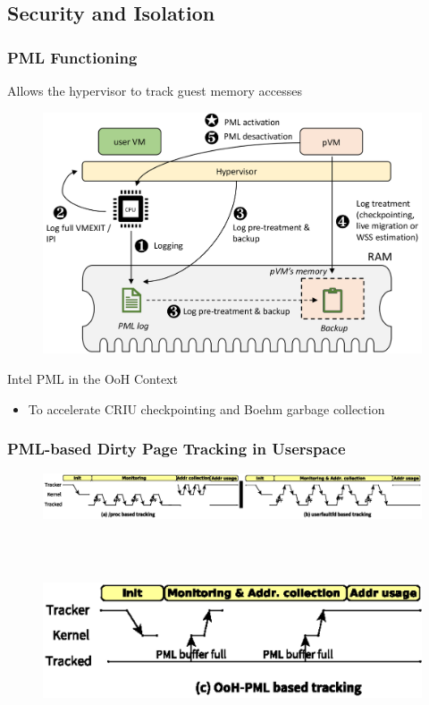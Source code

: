 \documentclass[xcolor=table,bigger,unknownkeysallowed]{beamer}
\begin{document}
\subsection{Security and Isolation}
\begin{frame}
\frametitle{PML Functioning} 
	Allows the hypervisor to track guest memory accesses\\
	\begin{figure}
		\centering
		\includegraphics[width=.55\columnwidth]{fig/pml_actual}
	\end{figure}
	
	\begin{block}{Intel PML in the OoH Context}
		\begin{itemize}
			\item To accelerate CRIU checkpointing and Boehm garbage collection
		\end{itemize}
	\end{block}				
\end{frame}
\begin{frame}
\frametitle{PML-based Dirty Page Tracking in Userspace} 
	\begin{figure}
	\centering
		\includegraphics[width=1\columnwidth]{fig/solutions1}
	\end{figure}
~\\			
~\\
	\begin{figure}
	\centering
		\includegraphics[width=.6\columnwidth]{fig/solutions2}				
	\end{figure}							
\end{frame}          
\end{document}
